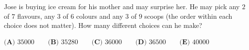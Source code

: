 Jose is buying ice cream for his mother and may surprise her. He may pick any $2$ of $7$ flavours, any $3$ of $6$ colours and any $3$ of $9$ scoops (the order within each choice does not matter). How many different choices can he make?

$\textbf{(A) } 35000 \qquad \textbf{(B) } 35280 \qquad \textbf{(C) } 36000 \qquad \textbf{(D) } 36500 \qquad \textbf{(E) } 40000$
